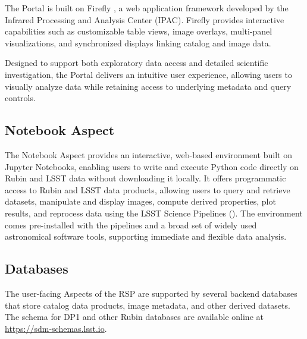 The Portal is built on \gls{Firefly} \citep{2019ASPC..521...32W}, a  web application framework developed by the Infrared Processing and Analysis Center (IPAC).
\gls{Firefly} provides interactive capabilities such as customizable table views, image overlays, multi-panel visualizations, and synchronized displays linking catalog and image data.

Designed to support both exploratory data access and detailed scientific investigation, the Portal delivers an intuitive user experience, allowing users to visually analyze data while retaining access to underlying metadata and query controls.

\subsection{Notebook Aspect}
\label{subsec:notebook}
The Notebook Aspect provides an interactive, web-based environment built on Jupyter Notebooks, enabling users to write and execute Python code directly on Rubin and \gls{LSST} data without downloading it locally.
It offers programmatic access to Rubin and LSST data products, allowing users to query and retrieve datasets, manipulate and display images, compute derived properties, plot results, and reprocess data using the LSST Science Pipelines ().
The environment comes pre-installed with the pipelines and a broad set of widely used astronomical \gls{software} tools, supporting immediate and flexible data analysis.

\subsection{Databases}
\label{ssec:databases}
The user-facing Aspects of the \gls{RSP} are supported by several backend databases that store catalog data products, image metadata, and other derived datasets.
The \gls{schema} for \gls{DP1} and other Rubin databases are available online at \url{https://sdm-schemas.lsst.io}.

